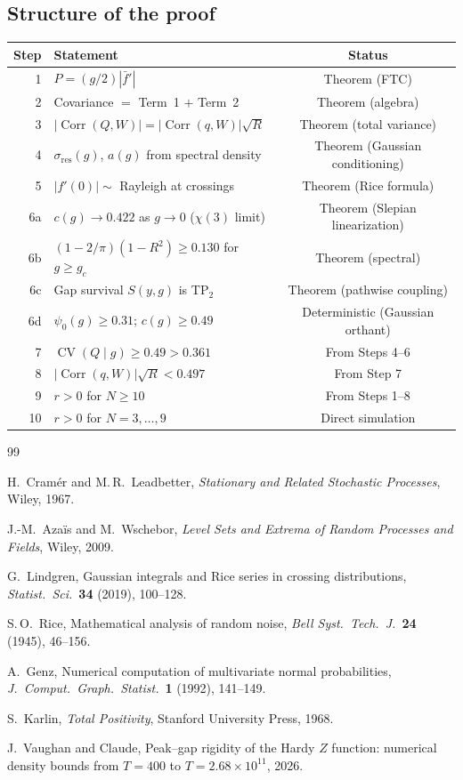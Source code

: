 \documentclass[11pt]{article}
\DeclareMathOperator{\Corr}{Corr}
\DeclareMathOperator{\CV}{CV}
\begin{document}
\subsection*{Structure of the proof}
\begin{center}
\begin{tabular}{rlc}
\toprule
Step & Statement & Status \\
\midrule
1 & $P = (g/2)|\bar{f}'|$ & Theorem (FTC) \\
2 & Covariance $=$ Term~1 $+$ Term~2 & Theorem (algebra) \\
3 & $|\Corr(Q,W)| = |\Corr(q,W)|\sqrt{R}$ & Theorem (total variance) \\
4 & $\sigma_{\mathrm{res}}(g)$, $a(g)$ from spectral density & Theorem (Gaussian conditioning) \\
5 & $|f'(0)| \sim$ Rayleigh at crossings & Theorem (Rice formula) \\
6a & $c(g) \to 0.422$ as $g \to 0$ ($\chi(3)$ limit) &
     Theorem (Slepian linearization) \\
6b & $(1{-}2/\pi)(1{-}R^2) \geq 0.130$ for $g \geq g_c$ &
     Theorem (spectral) \\
6c & Gap survival $S(y,g)$ is TP$_2$ &
     Theorem (pathwise coupling) \\
6d & $\psi_0(g) \geq 0.31$; $c(g) \geq 0.49$ &
     Deterministic (Gaussian orthant) \\
7 & $\CV(Q \mid g) \geq 0.49 > 0.361$ & From Steps 4--6 \\
8 & $|\Corr(q,W)|\sqrt{R} < 0.497$ & From Step 7 \\
9 & $r > 0$ for $N \geq 10$ & From Steps 1--8 \\
10 & $r > 0$ for $N = 3,\ldots,9$ & Direct simulation \\
\bottomrule
\end{tabular}
\end{center}

\begin{thebibliography}{99}

H.~Cram\'er and M.\,R.~Leadbetter,
\emph{Stationary and Related Stochastic Processes}, Wiley, 1967.

J.-M.~Aza\"is and M.~Wschebor,
\emph{Level Sets and Extrema of Random Processes and Fields}, Wiley, 2009.

G.~Lindgren,
Gaussian integrals and Rice series in crossing distributions,
\emph{Statist.\ Sci.}\ \textbf{34} (2019), 100--128.

S.\,O.~Rice,
Mathematical analysis of random noise,
\emph{Bell Syst.\ Tech.\ J.}\ \textbf{24} (1945), 46--156.

A.~Genz,
Numerical computation of multivariate normal probabilities,
\emph{J.\ Comput.\ Graph.\ Statist.}\ \textbf{1} (1992), 141--149.

S.~Karlin,
\emph{Total Positivity}, Stanford University Press, 1968.

J.~Vaughan and Claude,
Peak--gap rigidity of the Hardy $Z$ function:
numerical density bounds from $T = 400$ to $T = 2.68 \times 10^{11}$,
2026.

\end{thebibliography}
\end{document}
